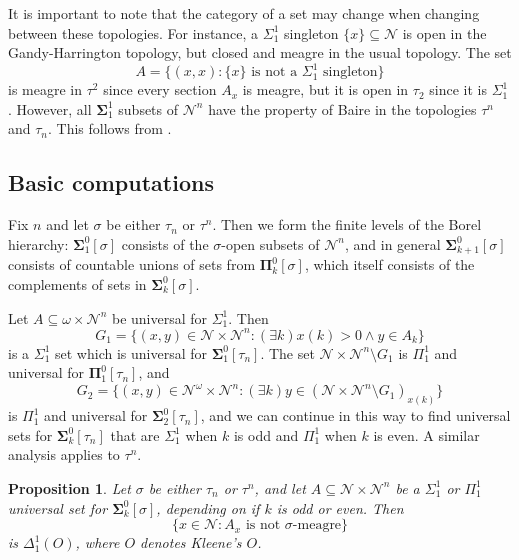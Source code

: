 \documentclass[11pt, english]{article}
\newtheorem{prop}{Proposition}
\newcommand{\baire}{\mathscr N}
\def\bSigma{{\boldsymbol{\Sigma}}}
\def\bPi{{\boldsymbol{\Pi}}}
\begin{document}
It is important to note that the category of a set may change when
changing between these topologies. For instance, a $\Sigma^1_1$
singleton $\{x\}\subseteq \baire$ is open in the Gandy-Harrington
topology, but closed and meagre in the usual topology. The set
$$
A=\{(x,x): \{x\} \text{ is not a $\Sigma^1_1$ singleton}\}
$$
is meagre in $\tau^2$ since every section $A_x$ is meagre, but it
is open in $\tau_2$ since it is $\Sigma^1_1$. However, all
$\bSigma^1_1$ subsets of $\baire^n$ have the property of Baire in
the topologies $\tau^n$ and $\tau_n$. This follows from
\cite[Theorem 21.8]{kechris95}.

\subsection{Basic computations}

Fix $n$ and let $\sigma$ be either $\tau_n$ or $\tau^n$. Then we
form the finite levels of the Borel hierarchy:
$\bSigma^0_1[\sigma]$ consists of the $\sigma$-open subsets of
$\baire^n$, and in general $\bSigma^0_{k+1}[\sigma]$ consists of
countable unions of sets from $\bPi^0_k[\sigma]$, which itself
consists of the complements of sets in $\bSigma^0_{k}[\sigma]$.

Let $A\subseteq\omega\times\baire^n$ be universal for
$\Sigma^1_1$. Then
$$
G_1=\{(x,y)\in\baire\times\baire^n: (\exists k) x(k)>0\wedge y\in
A_k\}
$$
is a $\Sigma^1_1$ set which is universal for
$\bSigma^0_1[\tau_n]$. The set $\baire\times\baire^n\setminus G_1$
is $\Pi^1_1$ and universal for $\bPi^0_1[\tau_n]$, and
$$
G_2=\{(x,y)\in \baire^\omega\times\baire^n: (\exists k) y\in
(\baire\times\baire^n\setminus G_1)_{x(k)}\}
$$
is $\Pi^1_1$ and universal for $\bSigma^0_2[\tau_n]$, and we can
continue in this way to find universal sets for
$\bSigma^0_k[\tau_n]$ that are $\Sigma^1_1$ when $k$ is odd and
$\Pi^1_1$ when $k$ is even. A similar analysis applies to
$\tau^n$.

\begin{prop}
Let $\sigma$ be either $\tau_n$ or $\tau^n$, and let
$A\subseteq\baire\times\baire^n$ be a $\Sigma^1_1$ or $\Pi^1_1$
universal set for $\bSigma^0_k[\sigma]$, depending on if $k$ is
odd or even. Then
$$
\{x\in\baire: A_x\text{ is not } \sigma\text{-meagre}\}
$$
is $\Delta^1_1(O)$, where $O$ denotes Kleene's $O$.\label{finProp}
\end{prop}
\end{document}
